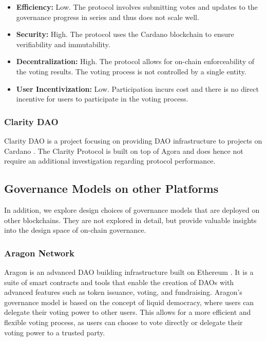 \documentclass[11pt]{article}
\begin{document}
\begin{itemize}
    \item \textbf{Efficiency:} Low. The protocol involves submitting votes and updates to the governance progress in series and thus does not scale well.
    \item \textbf{Security:} High. The protocol uses the Cardano blockchain to ensure verifiability and immutability.
    \item \textbf{Decentralization:} High. The protocol allows for on-chain enforceability of the voting results. The voting process is not controlled by a single entity.
    \item \textbf{User Incentivization:} Low. Participation incurs cost and there is no direct incentive for users to participate in the voting process.
\end{itemize}

\subsubsection{Clarity DAO}

Clarity DAO is a project focusing on providing DAO infrastructure to projects on Cardano \cite{panchot2023clarity}.
The Clarity Protocol is built on top of Agora and does hence not require an additional investigation regarding protocol performance.



\subsection{Governance Models on other Platforms}

In addition, we explore design choices of governance models that are deployed on other blockchains.
They are not explored in detail, but provide valuable insights into the design space of on-chain governance.

\subsubsection{Aragon Network}

Aragon is an advanced DAO building infrastructure built on Ethereum \cite{aragon}.
It is a suite of smart contracts and tools that enable the creation of DAOs with advanced features such as token issuance, voting, and fundraising.
Aragon's governance model is based on the concept of liquid democracy, where users can delegate their voting power to other users.
This allows for a more efficient and flexible voting process, as users can choose to vote directly or delegate their voting power to a trusted party.
\end{document}
